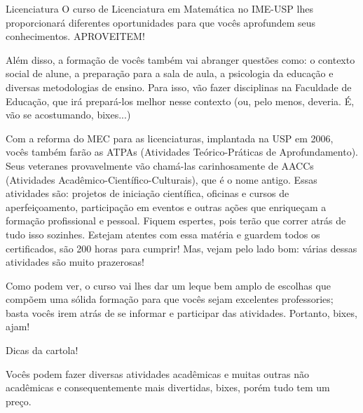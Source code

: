 \begin{subsecao}{Licenciatura}
O curso de Licenciatura em Matemática no IME-USP lhes proporcionará diferentes oportunidades para
que vocês aprofundem seus conhecimentos. APROVEITEM!

Além disso, a formação de vocês também vai abranger questões como: o contexto
social de alune, a preparação para a sala de aula, a psicologia da educação e
diversas metodologias de ensino. Para isso, vão fazer disciplinas na
Faculdade de Educação, que irá prepará-los melhor nesse contexto (ou, pelo
menos, deveria. É, vão se acostumando, bixes...)

Com a reforma do MEC para as licenciaturas, implantada na USP em 2006,
vocês também farão as ATPAs (Atividades Teórico-Práticas de Aprofundamento).
Seus veteranes provavelmente vão chamá-las carinhosamente de AACCs (Atividades
Acadêmico-Científico-Culturais), que é o nome antigo. Essas atividades são:
projetos de iniciação científica, oficinas e cursos de aperfeiçoamento,
participação em eventos e outras ações que enriqueçam a formação profissional e
pessoal. Fiquem espertes, pois terão que correr atrás de tudo isso sozinhes.
Estejam atentes com essa matéria e guardem todos os certificados, são 200 horas para cumprir! 
Mas, vejam pelo lado bom: várias dessas atividades são muito prazerosas!

Como podem ver, o curso vai lhes dar um leque bem amplo de escolhas que
compõem uma sólida formação para que vocês sejam excelentes professories; basta 
vocês irem atrás de se informar e participar das atividades. Portanto, bixes, ajam!

\begin{subsubsecao}{Dicas da cartola!}

Vocês podem fazer diversas atividades acadêmicas e muitas outras não acadêmicas e
consequentemente mais divertidas, bixes, porém tudo tem um preço.


\end{subsubsecao}
\end{subsecao}
